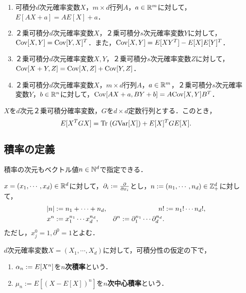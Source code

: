 \documentclass[uplatex,dvipdfmx]{jsreport}
\begin{document}
\begin{proposition}\mbox{}
    \begin{enumerate}
        \item 可積分$d$次元確率変数$X$，$m\times d$行列$A$，$a\in\mathbb{R}^m$に対して，$E[AX+a]=AE[X]+a$．
        \item ２乗可積分$d$次元確率変数$X$，２乗可積分$s$次元確率変数$Y$に対して，$\mathrm{Cov}[X,Y]=\mathrm{Cov}[Y,X]^T$．また，$\mathrm{Cov}[X,Y]=E[XY^T]-E[X]E[Y]^T$．
        \item ２乗可積分$d$次元確率変数$X,Y$，２乗可積分$s$次元確率変数$Z$に対して，$\mathrm{Cov}[X+Y,Z]=\mathrm{Cov}[X,Z]+\mathrm{Cov}[Y,Z]$．
        \item ２乗可積分$d$次元確率変数$X$，$m\times d$行列$A$，$a\in\mathbb{R}^m$，２乗可積分$s$次元確率変数$Y$，$b\in\mathbb{R}^n$に対して，$\mathrm{Cov}[AX+a,BY+b]=A\mathrm{Cov}[X,Y]B^T$．
    \end{enumerate}
\end{proposition}

\begin{proposition}
    $X$を$d$次元２乗可積分確率変数，$G$を$d\times d$定数行列とする．このとき，
    \[E[X^TGX]=\mathrm{Tr}\;(G\mathrm{Var}[X])+E[X]^TGE[X].\]
\end{proposition}

\subsection{積率の定義}

\begin{tcolorbox}[colframe=ForestGreen, colback=ForestGreen!10!white,breakable,colbacktitle=ForestGreen!40!white,coltitle=black,fonttitle=\bfseries\sffamily,
    title=]
    積率の次元もベクトル値$n\in\mathbb{N}^d$で指定できる．
\end{tcolorbox}

\begin{notation}
    $x=(x_1,\cdots,x_d)\in\mathbb{R}^d$に対して，$\partial_i:=\frac{\partial }{\partial x_i}$とし，$n:=(n_1,\cdots,n_d)\in\mathbb{Z}^d_+$に対して，
    \begin{align*}
        \lvert n\rvert&:=n_1+\cdots+n_d,&n!&:=n_1!\cdots n_d!,\\
        x^n&:=x_1^{n_1}\cdots x_d^{n_d},&\partial^n:=\partial_1^{n_1}\cdots\partial_d^{n_d}.
    \end{align*}
    ただし，$x^0_j=1,\partial^0=1$とよむ．
\end{notation}

\begin{definition}
    $d$次元確率変数$X=(X_1,\cdots,X_d)$に対して，可積分性の仮定の下で，
    \begin{enumerate}
        \item $\alpha_n:=E[X^n]$を\textbf{$n$次積率}という．
        \item $\mu_n:=E[(X-E[X])^n]$を\textbf{$n$次中心積率}という．
    \end{enumerate}
\end{definition}
\end{document}
